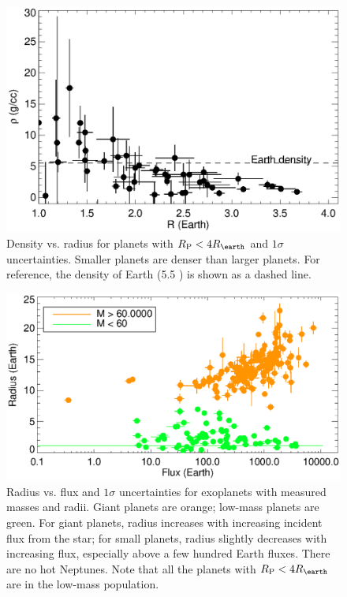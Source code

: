 \documentclass[11pt]{aastex}
\newcommand{\rspecial}{4 \rearth}
\begin{document}
\begin{figure}[htbp] %
   \centering
    \includegraphics[width=6in]{rhor_4.eps} 
   \caption{Density vs. radius for planets with $\rpl < \rspecial $ and $1\sigma$ uncertainties.  Smaller planets are denser than larger planets.  For reference, the density of Earth (5.5 \gcc) is shown as a dashed line.}
   \label{fig:rhor}
\end{figure}


\begin{figure}[htbp] %
   \centering
      \includegraphics[width=6in]{flux_dependence.eps} 
   \caption{Radius vs. flux and $1\sigma$ uncertainties for exoplanets with measured masses and radii.  Giant planets are orange; low-mass planets are green.  For giant planets, radius increases with increasing incident flux from the star; for small planets, radius slightly decreases with increasing flux, especially above a few hundred Earth fluxes.  There are no hot Neptunes.  Note that all the planets with $\rpl < 4 \rearth$ are in the low-mass population.}
   \label{fig:flux_radius}
\end{figure}
\end{document}
